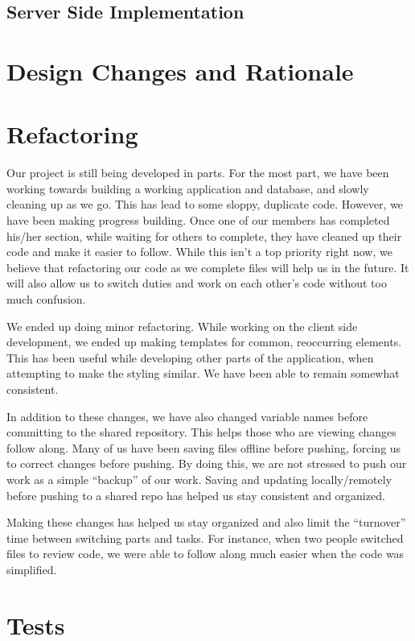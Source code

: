 \documentclass[12pt]{article}
\begin{document}
\subsection{Server Side Implementation}

\section{Design Changes and Rationale}

\section{Refactoring}

Our project is still being developed in parts. For the most part, we have
been working towards building a working application and database, and slowly
cleaning up as we go. This has lead to some sloppy, duplicate code. However,
we have been making progress building. Once one of our members has completed
his/her section, while waiting for others to complete, they have cleaned up
their code and make it easier to follow. While this isn’t a top priority
right now, we believe that refactoring our code as we complete files will
help us in the future. It will also allow us to switch duties and work on
each other's code without too much confusion.

We ended up doing minor refactoring. While working on the client side
development, we ended up making templates for common, reoccurring elements.
This has been useful while developing other parts of the application, when
attempting to make the styling similar. We have been able to remain somewhat
consistent.

In addition to these changes, we have also changed variable names before
committing to the shared repository. This helps those who are viewing
changes follow along. Many of us have been saving files offline before
pushing, forcing us to correct changes before pushing. By doing this, we are
not stressed to push our work as a simple “backup” of our work. Saving and
updating locally/remotely before pushing to a shared repo has helped us stay
consistent and organized.

Making these changes has helped us stay organized and also limit the
“turnover” time between switching parts and tasks. For instance, when two
people switched files to review code, we were able to follow along much
easier when the code was simplified.

\section{Tests}
\end{document}
